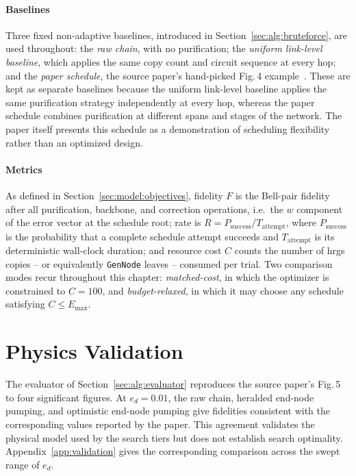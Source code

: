 \paragraph{Baselines}
\label{sec:exp:baselines}

Three fixed non-adaptive baselines, introduced in Section~\ref{sec:alg:bruteforce}, are used throughout: the \emph{raw chain}, with no purification; the \emph{uniform link-level baseline}, which applies the same copy count and circuit sequence at every hop; and the \emph{paper schedule}, the source paper's hand-picked Fig.\,4 example~\cite{Benchasattabuse2025Integrating}. These are kept as separate baselines because the uniform link-level baseline applies the same purification strategy independently at every hop, whereas the paper schedule combines purification at different spans and stages of the network. The paper itself presents this schedule as a demonstration of scheduling flexibility rather than an optimized design.

\paragraph{Metrics}
\label{sec:exp:metrics}

As defined in Section~\ref{sec:model:objectives}, fidelity $F$ is the Bell-pair fidelity after all purification, backbone, and correction operations, i.e.\ the $w$ component of the error vector at the schedule root; rate is $R=P_{\mathrm{success}}/T_{\mathrm{attempt}}$, where $P_{\mathrm{success}}$ is the probability that a complete schedule attempt succeeds and $T_{\mathrm{attempt}}$ is its deterministic wall-clock duration; and resource cost $C$ counts the number of \Gls{hrgs} copies -- or equivalently \texttt{GenNode} leaves -- consumed per trial. Two comparison modes recur throughout this chapter: \emph{matched-cost}, in which the optimizer is constrained to $C=100$, and \emph{budget-relaxed}, in which it may choose any schedule satisfying $C\le E_{\max}$.

\section{Physics Validation}
\label{sec:exp:validation}


The evaluator of Section~\ref{sec:alg:evaluator} reproduces the source paper's Fig.\,5~\cite{Benchasattabuse2025Integrating} to four significant figures. At $e_d=0.01$, the raw chain, heralded end-node pumping, and optimistic end-node pumping give fidelities consistent with the corresponding values reported by the paper. This agreement validates the physical model used by the search tiers but does not establish search optimality. Appendix~\ref{app:validation} gives the corresponding comparison across the swept range of $e_d$.

